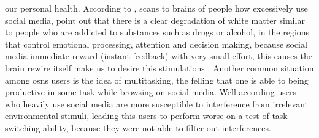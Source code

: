 our personal health. According to \cite{lin2012abnormal}, scans to brains of people how excessively use social media, point out that there is a clear degradation of white matter similar to people who are addicted to substances such as drugs or alcohol, in the regions that control emotional processing, attention and decision making, because social media immediate reward (instant feedback) with very small effort, this causes the brain rewire itself make us to desire this stimulations \cite{berridge1998role}. Another common situation among \glspl{osn} users is the idea of multitasking, the felling that one is able to being productive in some task while browsing on social media. Well according \cite{ophir2009cognitive} users who heavily use social media are more susceptible to interference from irrelevant environmental stimuli, leading this users to perform worse on a test of task-switching ability, because they were not able to filter out interferences.
